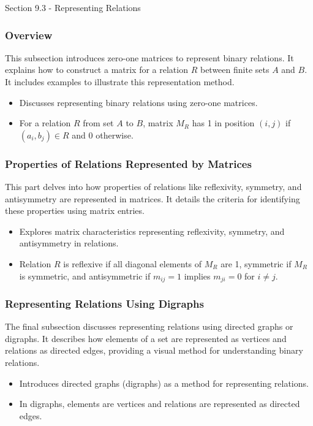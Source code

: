 \begin{notes}{Section 9.3 - Representing Relations}
    \subsubsection*{Overview}
    This subsection introduces zero-one matrices to represent binary relations. It explains how to construct a matrix for a relation $R$ between finite sets $A$ and $B$. It includes examples to 
    illustrate this representation method.
    \begin{itemize}
        \item Discusses representing binary relations using zero-one matrices.
        \item For a relation $R$ from set $A$ to $B$, matrix $M_R$ has 1 in position $(i,j)$ if $(a_i, b_j) \in R$ and 0 otherwise.
    \end{itemize}
    
    \subsubsection*{Properties of Relations Represented by Matrices}
    This part delves into how properties of relations like reflexivity, symmetry, and antisymmetry are represented in matrices. It details the criteria for identifying these properties using matrix 
    entries.
    \begin{itemize}
        \item Explores matrix characteristics representing reflexivity, symmetry, and antisymmetry in relations.
        \item Relation $R$ is reflexive if all diagonal elements of $M_R$ are 1, symmetric if $M_R$ is symmetric, and antisymmetric if $m_{ij} = 1$ implies $m_{ji} = 0$ for $i \neq j$.
    \end{itemize}
    
    \subsubsection*{Representing Relations Using Digraphs}
    The final subsection discusses representing relations using directed graphs or digraphs. It describes how elements of a set are represented as vertices and relations as directed edges, providing a 
    visual method for understanding binary relations.    
    \begin{itemize}
        \item Introduces directed graphs (digraphs) as a method for representing relations.
        \item In digraphs, elements are vertices and relations are represented as directed edges.
    \end{itemize}
\end{notes}

